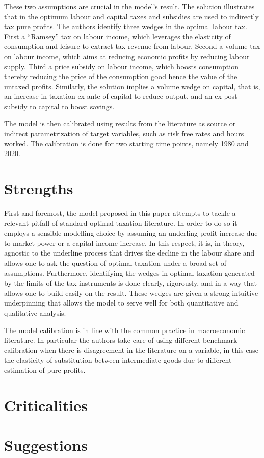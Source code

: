 \documentclass[american]{scrartcl}
\begin{document}
These two assumptions are crucial in the model's result. The solution illustrates that in the optimum labour and capital taxes and subsidies are used to indirectly tax pure profits. The authors identify three wedges in the optimal labour tax. First a ``Ramsey'' tax on labour income, which leverages the elasticity of consumption and leisure to extract tax revenue from labour. Second a volume tax on labour income, which aims at reducing economic profits by reducing labour supply. Third a price subsidy on labour income, which boosts consumption thereby reducing the price of the consumption good hence the value of the untaxed profits. Similarly, the solution implies a volume wedge on capital, that is, an increase in taxation ex-ante of capital to reduce output, and an ex-post subsidy to capital to boost savings.

The model is then calibrated using results from the literature as source or indirect parametrization of target variables, such as risk free rates and hours worked. The calibration is done for two starting time points, namely 1980 and 2020.


\newpage
\section{Strengths}

First and foremost, the model proposed in this paper attempts to tackle a relevant pitfall of standard optimal taxation literature. In order to do so it employs a sensible modelling choice by assuming an underling profit increase due to market power or a capital income increase. In this respect, it is, in theory, agnostic to the underline process that drives the decline in the labour share and allows one to ask the question of optimal taxation under a broad set of assumptions. Furthermore, identifying the wedges in optimal taxation generated by the limits of the tax instruments is done clearly, rigorously, and in a way that allows one to build easily on the result. These wedges are given a strong intuitive underpinning that allows the model to serve well for both quantitative and qualitative analysis.

The model calibration is in line with the common practice in macroeconomic literature. In particular the authors take care of using different benchmark calibration when there is disagreement in the literature on a variable, in this case the elasticity of substitution between intermediate goods due to different estimation of pure profits.



\newpage
\section{Criticalities}

\newpage
\section{Suggestions}


\newpage
\nocite{*}
\printbibliography
\end{document}
